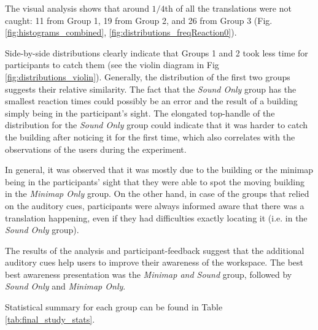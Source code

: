 The visual analysis shows that around $1/4$th of all the translations were not caught: 11 from Group 1, 19 from Group 2, and 26 from Group 3 (Fig. \ref{fig:histograms_combined}, \ref{fig:distributions_freqReaction0}).

Side-by-side distributions clearly indicate that Groups 1 and 2 took less time for participants to catch them (see the violin diagram in Fig \ref{fig:distributions_violin}). Generally, the distribution of the first two groups suggests their relative similarity. The fact that the \textit{Sound Only} group has the smallest reaction times could possibly be an error and the result of a building simply being in the participant's sight. The elongated top-handle of the distribution for the \textit{Sound Only} group could indicate that it was harder to catch the building after noticing it for the first time, which also correlates with the observations of the users during the experiment.

In general, it was observed that it was mostly due to the building or the minimap being in the participants' sight that they were able to spot the moving building in the \textit{Minimap Only} group. On the other hand, in case of the groups that relied on the auditory cues, participants were always informed aware that there was a translation happening, even if they had difficulties exactly locating it (i.e. in the \textit{Sound Only} group).

The results of the analysis and participant-feedback suggest that the additional auditory cues help users to improve their awareness of the workspace. The best best awareness presentation was the \textit{Minimap and Sound} group, followed by \textit{Sound Only} and \textit{Minimap Only}.

Statistical summary for each group can be found in Table \ref{tab:final_study_stats}.

